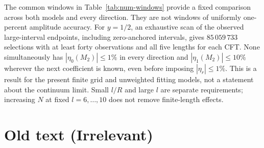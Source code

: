 \documentclass[11pt]{article}
\begin{document}
The common windows in Table~\ref{tab:num-windows} provide a
fixed comparison across both models and every direction. They
are not windows of uniformly one-percent amplitude accuracy.
For $y=1/2$, an exhaustive scan of the observed large-interval endpoints,
including zero-anchored intervals, gives $85\,059\,733$ selections
with at least forty observations and all five lengths for each
CFT. None simultaneously has $|\eta_0(M_2)|\leq1\%$ in every
direction and $|\eta_1(M_2)|\leq10\%$ wherever the next
coefficient is known, even before imposing $|\eta_r|\leq1\%$.
This is a result for the present finite grid and unweighted
fitting models, not a statement about the continuum limit.
Small $l/R$ and large $l$ are separate requirements; increasing
$N$ at fixed $l=6,\ldots,10$ does not remove finite-length effects.



\section{Old text (Irrelevant)}
\end{document}
